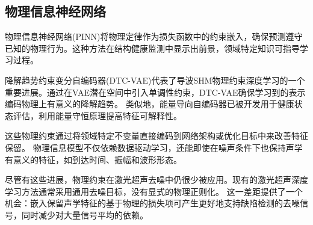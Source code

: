 \subsection{物理信息神经网络}
\label{sec:physics-informed}

物理信息神经网络(PINN)将物理定律作为损失函数中的约束嵌入，确保预测遵守已知的物理行为\cite{}。这种方法在结构健康监测中显示出前景，领域特定知识可指导学习过程。

降解趋势约束变分自编码器(DTC-VAE)代表了导波SHM物理约束深度学习的一个重要进展\cite{dtcvae2026}。通过在VAE潜在空间中引入单调性约束，DTC-VAE确保学习到的表示编码物理上有意义的降解趋势。
类似地，能量导向自编码器已被开发用于健康状态评估，利用能量守恒原理提高特征可解释性\cite{perry2026health}。

这些物理约束通过将领域特定不变量直接编码到网络架构或优化目标中来改善特征保留。
物理信息模型不仅依赖数据驱动学习，还能即使在噪声条件下也保持声学有意义的特征，如到达时间、振幅和波形形态。

尽管有这些进展，物理约束在激光超声去噪中仍很少被应用。现有的激光超声深度学习方法通常采用通用去噪目标，没有显式的物理正则化。
这一差距提供了一个机会：嵌入保留声学特征的基于物理的损失项可产生更好地支持缺陷检测的去噪信号，同时减少对大量信号平均的依赖。

